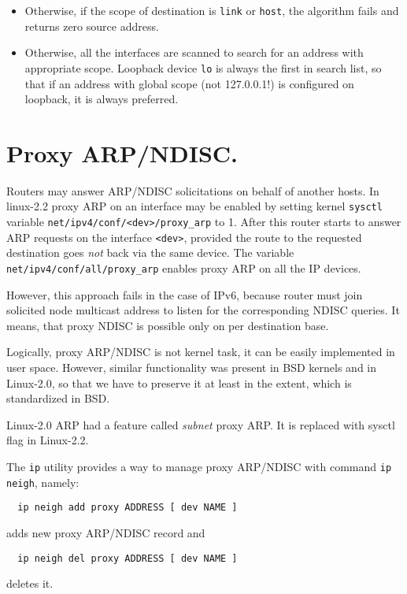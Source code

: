 \begin{itemize}
\begin{itemize}
\end{itemize}


\item Otherwise, if the scope of destination is \verb|link| or \verb|host|,
the algorithm fails and returns zero source address.

\item Otherwise, all the interfaces are scanned to search for an address
with appropriate scope. Loopback device \verb|lo| is always the first
in search list, so that if an address with global scope (not 127.0.0.1!)
is configured on loopback, it is always preferred.

\end{itemize}


\section{Proxy ARP/NDISC.}
\label{PROXY-NEIGH}

Routers may answer ARP/NDISC solicitations on behalf of another hosts.
In linux-2.2 proxy ARP on an interface may be enabled
by setting kernel \verb|sysctl| variable 
\verb|net/ipv4/conf/<dev>/proxy_arp| to 1. After this router
starts to answer ARP requests on the interface \verb|<dev>|, provided
the route to the requested destination goes {\em not\/} back via the same
device. The variable \verb|net/ipv4/conf/all/proxy_arp| enables proxy
ARP on all the IP devices.

However, this approach fails in the case of IPv6, because router
must join solicited node multicast address to listen for the corresponding
NDISC queries. It means, that proxy NDISC is possible only on per destination
base.

Logically, proxy ARP/NDISC is not kernel task, it can be easily implemented
in user space. However, similar functionality was present in BSD kernels
and in Linux-2.0, so that we have to preserve it at least in the extent, which
is standardized in BSD.
\begin{NB}
  Linux-2.0 ARP had a feature called {\em subnet\/} proxy ARP.
  It is replaced with sysctl flag in Linux-2.2.
\end{NB}


The \verb|ip| utility provides a way to manage proxy ARP/NDISC
with command \verb|ip neigh|, namely:
\begin{verbatim}
  ip neigh add proxy ADDRESS [ dev NAME ]
\end{verbatim}
adds new proxy ARP/NDISC record and
\begin{verbatim}
  ip neigh del proxy ADDRESS [ dev NAME ]
\end{verbatim}
deletes it.

